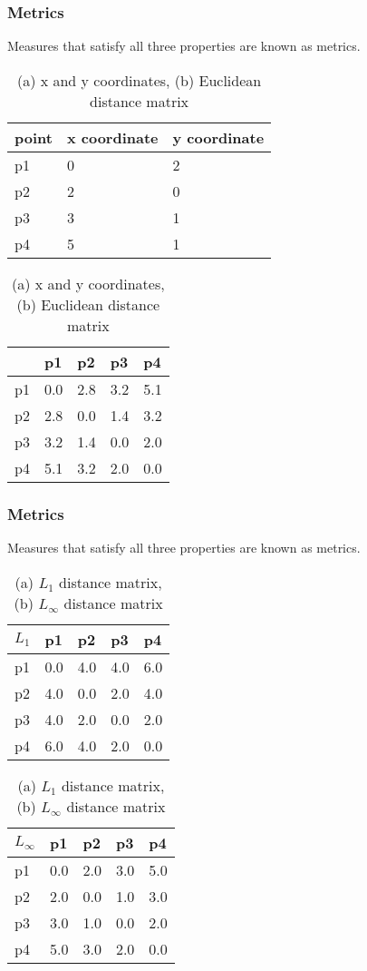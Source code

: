 \begin{frame}[fragile]\frametitle{Metrics}

	Measures that satisfy all three properties are known as metrics.

	\begin{table}[!h]
		\centering
		\begin{tabular}{| l | l | l |}
			\hline
			point & x coordinate & y coordinate \\ \hline
			p1 & 0 & 2 \\ \hline
			p2 & 2 & 0 \\ \hline
			p3 & 3 & 1 \\ \hline
			p4 & 5 & 1 \\ \hline
		\end{tabular}
		\begin{tabular}{| l | l | l | l | l |}
			\hline
			 & p1 & p2 & p3 & p4 \\ \hline
			p1 & 0.0 & 2.8 & 3.2 & 5.1 \\ \hline
			p2 & 2.8 & 0.0 & 1.4 & 3.2 \\ \hline
			p3 & 3.2 & 1.4 & 0.0 & 2.0 \\ \hline
			p4 & 5.1 & 3.2 & 2.0 & 0.0 \\ \hline
		\end{tabular}
		\caption{(a) x and y coordinates, (b) Euclidean distance matrix}
\end{table}
\end{frame}


\begin{frame}[fragile]\frametitle{Metrics}

	Measures that satisfy all three properties are known as metrics.

\begin{table}[!h]
		\centering
		\begin{tabular}{| l | l | l | l | l |}
			\hline
			$L_{1}$ & p1 & p2 & p3 & p4 \\ \hline
			p1 & 0.0 & 4.0 & 4.0 & 6.0 \\ \hline
			p2 & 4.0 & 0.0 & 2.0 & 4.0 \\ \hline
			p3 & 4.0 & 2.0 & 0.0 & 2.0 \\ \hline
			p4 & 6.0 & 4.0 & 2.0 & 0.0 \\ \hline
		\end{tabular}
		\begin{tabular}{| l | l | l | l | l |}
			\hline
			$L_\infty$ & p1 & p2 & p3 & p4 \\ \hline 
			p1 & 0.0 & 2.0 & 3.0 & 5.0 \\ \hline
			p2 & 2.0 & 0.0 & 1.0 & 3.0 \\ \hline
			p3 & 3.0 & 1.0 & 0.0 & 2.0 \\ \hline
			p4 & 5.0 & 3.0 & 2.0 & 0.0 \\ \hline
		\end{tabular}
		\caption{(a) $L_{1}$ distance matrix, (b) $L_{\infty}$ distance matrix}
\end{table}
\end{frame}

